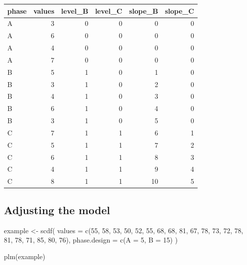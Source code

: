 \documentclass[
]{book}
\newenvironment{Shaded}{\begin{snugshade}}{\end{snugshade}}
\newcommand{\AttributeTok}[1]{\textcolor[rgb]{0.77,0.63,0.00}{#1}}
\newcommand{\DecValTok}[1]{\textcolor[rgb]{0.00,0.00,0.81}{#1}}
\newcommand{\FunctionTok}[1]{\textcolor[rgb]{0.00,0.00,0.00}{#1}}
\newcommand{\NormalTok}[1]{#1}
\newcommand{\OtherTok}[1]{\textcolor[rgb]{0.56,0.35,0.01}{#1}}
\begin{document}
\begin{tabular}{l|r|r|r|r|r}
\hline
phase & values & level\_B & level\_C & slope\_B & slope\_C\\
\hline
A & 3 & 0 & 0 & 0 & 0\\
\hline
A & 6 & 0 & 0 & 0 & 0\\
\hline
A & 4 & 0 & 0 & 0 & 0\\
\hline
A & 7 & 0 & 0 & 0 & 0\\
\hline
B & 5 & 1 & 0 & 1 & 0\\
\hline
B & 3 & 1 & 0 & 2 & 0\\
\hline
B & 4 & 1 & 0 & 3 & 0\\
\hline
B & 6 & 1 & 0 & 4 & 0\\
\hline
B & 3 & 1 & 0 & 5 & 0\\
\hline
C & 7 & 1 & 1 & 6 & 1\\
\hline
C & 5 & 1 & 1 & 7 & 2\\
\hline
C & 6 & 1 & 1 & 8 & 3\\
\hline
C & 4 & 1 & 1 & 9 & 4\\
\hline
C & 8 & 1 & 1 & 10 & 5\\
\hline
\end{tabular}

\hypertarget{adjusting-the-model}{%
\subsection{Adjusting the model}\label{adjusting-the-model}}

\begin{Shaded}
\begin{Highlighting}[]
\NormalTok{example }\OtherTok{\textless{}{-}} \FunctionTok{scdf}\NormalTok{(}
   \AttributeTok{values =} \FunctionTok{c}\NormalTok{(}\DecValTok{55}\NormalTok{, }\DecValTok{58}\NormalTok{, }\DecValTok{53}\NormalTok{, }\DecValTok{50}\NormalTok{, }\DecValTok{52}\NormalTok{, }\DecValTok{55}\NormalTok{, }\DecValTok{68}\NormalTok{, }\DecValTok{68}\NormalTok{, }\DecValTok{81}\NormalTok{, }\DecValTok{67}\NormalTok{, }\DecValTok{78}\NormalTok{, }\DecValTok{73}\NormalTok{, }\DecValTok{72}\NormalTok{, }\DecValTok{78}\NormalTok{, }\DecValTok{81}\NormalTok{, }\DecValTok{78}\NormalTok{, }\DecValTok{71}\NormalTok{, }\DecValTok{85}\NormalTok{, }\DecValTok{80}\NormalTok{, }\DecValTok{76}\NormalTok{),}
   \AttributeTok{phase.design =} \FunctionTok{c}\NormalTok{(}\AttributeTok{A =} \DecValTok{5}\NormalTok{, }\AttributeTok{B =} \DecValTok{15}\NormalTok{)}
\NormalTok{)}

\FunctionTok{plm}\NormalTok{(example)}
\end{Highlighting}
\end{Shaded}
\end{document}

